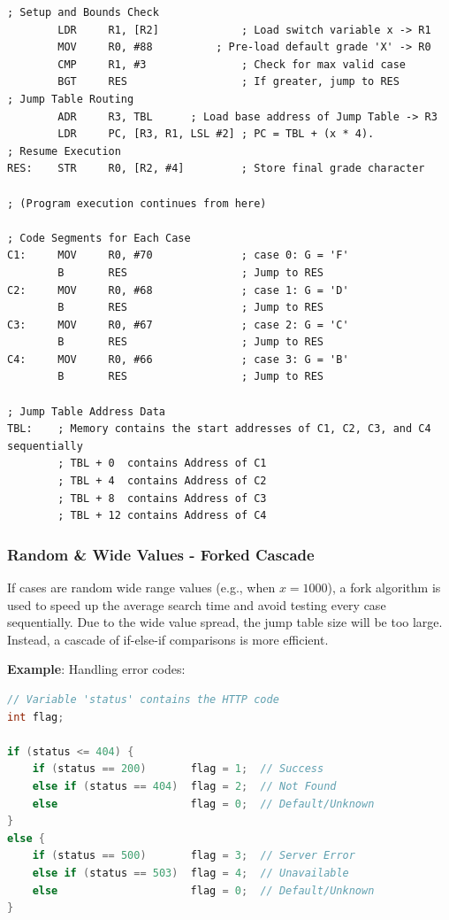 \documentclass[../comorg-part1.tex]{subfiles}
\begin{document}
\begin{lstlisting}[language=ARM, title={Jump Table Implementation}, keepspaces=true]
    ; Setup and Bounds Check
        LDR     R1, [R2]             ; Load switch variable x -> R1
        MOV     R0, #88          ; Pre-load default grade 'X' -> R0
        CMP     R1, #3               ; Check for max valid case
        BGT     RES                  ; If greater, jump to RES
; Jump Table Routing
        ADR     R3, TBL      ; Load base address of Jump Table -> R3
        LDR     PC, [R3, R1, LSL #2] ; PC = TBL + (x * 4).
; Resume Execution
RES:    STR     R0, [R2, #4]         ; Store final grade character
        
; (Program execution continues from here)

; Code Segments for Each Case
C1:     MOV     R0, #70              ; case 0: G = 'F'
        B       RES                  ; Jump to RES
C2:     MOV     R0, #68              ; case 1: G = 'D'
        B       RES                  ; Jump to RES
C3:     MOV     R0, #67              ; case 2: G = 'C'
        B       RES                  ; Jump to RES
C4:     MOV     R0, #66              ; case 3: G = 'B'
        B       RES                  ; Jump to RES

; Jump Table Address Data
TBL:    ; Memory contains the start addresses of C1, C2, C3, and C4 sequentially
        ; TBL + 0  contains Address of C1
        ; TBL + 4  contains Address of C2
        ; TBL + 8  contains Address of C3
        ; TBL + 12 contains Address of C4
\end{lstlisting}

\subsubsection{Random \& Wide Values - Forked Cascade}
If cases are random wide range values (e.g., when $x=1000$), a fork algorithm is used to speed up the average search time and avoid testing every case sequentially.\newline
Due to the wide value spread, the jump table size will be too large. Instead, a cascade of if-else-if comparisons is more efficient.

\noindent\textbf{Example}: Handling error codes:
\begin{lstlisting}[language=C, title={Forked Switch Logic: HTTP Status Codes}, keepspaces=true]
// Variable 'status' contains the HTTP code
int flag;

if (status <= 404) {
    if (status == 200)       flag = 1;  // Success
    else if (status == 404)  flag = 2;  // Not Found
    else                     flag = 0;  // Default/Unknown
} 
else {
    if (status == 500)       flag = 3;  // Server Error
    else if (status == 503)  flag = 4;  // Unavailable
    else                     flag = 0;  // Default/Unknown
}
\end{lstlisting}
\end{document}
